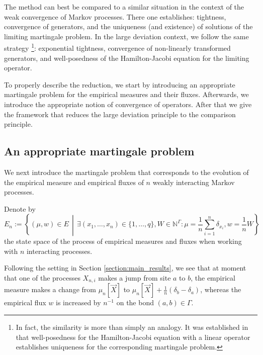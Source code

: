 \documentclass[a4paper]{article}
\newcommand{\bN}{\mathbb{N}}
\numberwithin{equation}{section}
\theoremstyle{definition}
\begin{document}
\smallskip

The method can best be compared to a similar situation in the context of the weak convergence of Markov processes. There one establishes: tightness, convergence of generators, and the uniqueness (and existence) of solutions of the limiting martingale problem. In the large deviation context, we follow the same strategy \footnote{In fact, the similarity is more than simply an analogy. It was established in \cite{CoKu15} that well-posedness for the Hamilton-Jacobi equation with a linear operator establishes uniqueness for the corresponding martingale problem.}: exponential tightness, convergence of non-linearly transformed generators, and well-posedness of the Hamilton-Jacobi equation for the limiting operator. 

\smallskip

To properly describe the reduction, we start by introducing an appropriate martingale problem for the empirical measures and their fluxes. Afterwards, we introduce the appropriate notion of convergence of operators. After that we give the framework that reduces the large deviation principle to the comparison principle.



\subsection{An appropriate martingale problem}  \label{section:proof_martingale_problem}

We next introduce the martingale problem that corresponds to the evolution of the empirical measure and empirical fluxes of $n$ weakly interacting Markov processes. 

Denote by 
\begin{equation*}
	E_n := \left\{(\mu,w) \in E \, \middle| \, \exists (x_1,\dots,x_n) \in \{1,\dots,q\}, W \in \bN^\Gamma: \mu = \frac{1}{n} \sum_{i=1}^n \delta_{x_i}, w = \frac{1}{n}W\right\}
\end{equation*}
the state space of the process of empirical measures and fluxes when working with $n$ interacting processes.


Following the setting in Section \ref{section:main_results}, we see that at moment that one of the processes $X_{n,i}$ makes a jump from site $a$ to $b$, the empirical measure makes a change from $\mu_n[\vec{X}]$ to $\mu_n[\vec{X}] + \tfrac{1}{n}\left(\delta_b - \delta_a\right)$, whereas the empirical flux $w$ is increased by $n^{-1}$ on the bond $(a,b) \in \Gamma$.
\end{document}
